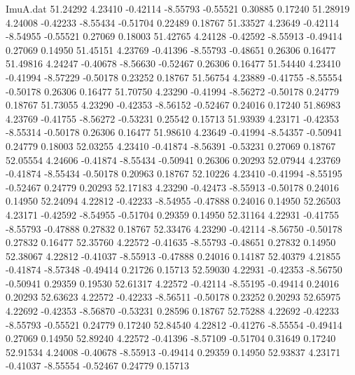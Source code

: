 \begin{filecontents}{ImuA.dat}
  51.24292    4.23410   -0.42114   -8.55793   -0.55521    0.30885    0.17240
  51.28919    4.24008   -0.42233   -8.55434   -0.51704    0.22489    0.18767
  51.33527    4.23649   -0.42114   -8.54955   -0.55521    0.27069    0.18003
  51.42765    4.24128   -0.42592   -8.55913   -0.49414    0.27069    0.14950
  51.45151    4.23769   -0.41396   -8.55793   -0.48651    0.26306    0.16477
  51.49816    4.24247   -0.40678   -8.56630   -0.52467    0.26306    0.16477
  51.54440    4.23410   -0.41994   -8.57229   -0.50178    0.23252    0.18767
  51.56754    4.23889   -0.41755   -8.55554   -0.50178    0.26306    0.16477
  51.70750    4.23290   -0.41994   -8.56272   -0.50178    0.24779    0.18767
  51.73055    4.23290   -0.42353   -8.56152   -0.52467    0.24016    0.17240
  51.86983    4.23769   -0.41755   -8.56272   -0.53231    0.25542    0.15713
  51.93939    4.23171   -0.42353   -8.55314   -0.50178    0.26306    0.16477
  51.98610    4.23649   -0.41994   -8.54357   -0.50941    0.24779    0.18003
  52.03255    4.23410   -0.41874   -8.56391   -0.53231    0.27069    0.18767
  52.05554    4.24606   -0.41874   -8.55434   -0.50941    0.26306    0.20293
  52.07944    4.23769   -0.41874   -8.55434   -0.50178    0.20963    0.18767
  52.10226    4.23410   -0.41994   -8.55195   -0.52467    0.24779    0.20293
  52.17183    4.23290   -0.42473   -8.55913   -0.50178    0.24016    0.14950
  52.24094    4.22812   -0.42233   -8.54955   -0.47888    0.24016    0.14950
  52.26503    4.23171   -0.42592   -8.54955   -0.51704    0.29359    0.14950
  52.31164    4.22931   -0.41755   -8.55793   -0.47888    0.27832    0.18767
  52.33476    4.23290   -0.42114   -8.56750   -0.50178    0.27832    0.16477
  52.35760    4.22572   -0.41635   -8.55793   -0.48651    0.27832    0.14950
  52.38067    4.22812   -0.41037   -8.55913   -0.47888    0.24016    0.14187
  52.40379    4.21855   -0.41874   -8.57348   -0.49414    0.21726    0.15713
  52.59030    4.22931   -0.42353   -8.56750   -0.50941    0.29359    0.19530
  52.61317    4.22572   -0.42114   -8.55195   -0.49414    0.24016    0.20293
  52.63623    4.22572   -0.42233   -8.56511   -0.50178    0.23252    0.20293
  52.65975    4.22692   -0.42353   -8.56870   -0.53231    0.28596    0.18767
  52.75288    4.22692   -0.42233   -8.55793   -0.55521    0.24779    0.17240
  52.84540    4.22812   -0.41276   -8.55554   -0.49414    0.27069    0.14950
  52.89240    4.22572   -0.41396   -8.57109   -0.51704    0.31649    0.17240
  52.91534    4.24008   -0.40678   -8.55913   -0.49414    0.29359    0.14950
  52.93837    4.23171   -0.41037   -8.55554   -0.52467    0.24779    0.15713

\end{filecontents}
